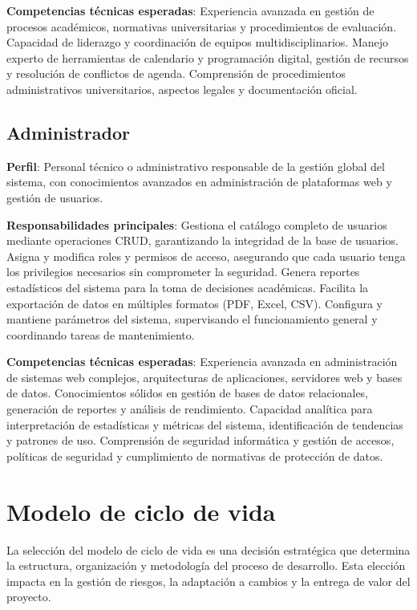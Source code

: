 \documentclass[12pt,a4paper,oneside]{report}
\begin{document}
\textbf{Competencias técnicas esperadas}: Experiencia avanzada en gestión de procesos académicos, normativas universitarias y procedimientos de evaluación. Capacidad de liderazgo y coordinación de equipos multidisciplinarios. Manejo experto de herramientas de calendario y programación digital, gestión de recursos y resolución de conflictos de agenda. Comprensión de procedimientos administrativos universitarios, aspectos legales y documentación oficial.

\subsection{Administrador}\label{administrador}

\textbf{Perfil}: Personal técnico o administrativo responsable de la
gestión global del sistema, con conocimientos avanzados en
administración de plataformas web y gestión de usuarios.

\textbf{Responsabilidades principales}: Gestiona el catálogo completo de usuarios mediante operaciones CRUD, garantizando la integridad de la base de usuarios. Asigna y modifica roles y permisos de acceso, asegurando que cada usuario tenga los privilegios necesarios sin comprometer la seguridad. Genera reportes estadísticos del sistema para la toma de decisiones académicas. Facilita la exportación de datos en múltiples formatos (PDF, Excel, CSV). Configura y mantiene parámetros del sistema, supervisando el funcionamiento general y coordinando tareas de mantenimiento.

\textbf{Competencias técnicas esperadas}: Experiencia avanzada en administración de sistemas web complejos, arquitecturas de aplicaciones, servidores web y bases de datos. Conocimientos sólidos en gestión de bases de datos relacionales, generación de reportes y análisis de rendimiento. Capacidad analítica para interpretación de estadísticas y métricas del sistema, identificación de tendencias y patrones de uso. Comprensión de seguridad informática y gestión de accesos, políticas de seguridad y cumplimiento de normativas de protección de datos.

\section{Modelo de ciclo de vida}\label{modelo-de-ciclo-de-vida}

La selección del modelo de ciclo de vida es una decisión estratégica que determina la estructura, organización y metodología del proceso de desarrollo. Esta elección impacta en la gestión de riesgos, la adaptación a cambios y la entrega de valor del proyecto.
\end{document}
